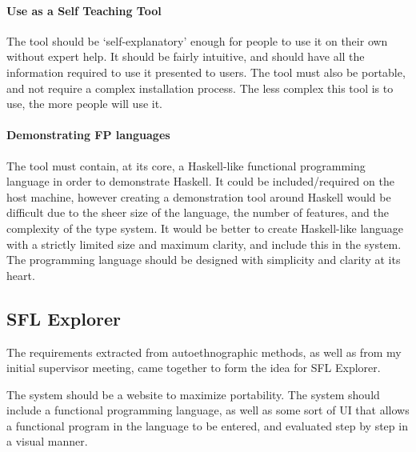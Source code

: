 \paragraph{Use as a Self Teaching Tool} The tool should be `self-explanatory' enough for people to use it on their own without expert help. It should be fairly intuitive, and should have all the information required to use it presented to users. The tool must also be portable, and not require a complex installation process. The less complex this tool is to use, the more people will use it. 

\paragraph{Demonstrating FP languages} The tool must contain, at its core, a Haskell-like functional programming language in order to demonstrate Haskell. It could be included/required on the host machine, however creating a demonstration tool around Haskell would be difficult due to the sheer size of the language, the number of features, and the complexity of the type system. It would be better to create Haskell-like language with a strictly limited size and maximum clarity, and include this in the system. The programming language should be designed with simplicity and clarity at its heart.

\subsection{SFL Explorer}
The requirements extracted from autoethnographic methods, as well as from my initial supervisor meeting, came together to form the idea for SFL Explorer. 

The system should be a website to maximize portability. The system should include a functional programming language, as well as some sort of UI that allows a functional program in the language to be entered, and evaluated step by step in a visual manner. 



